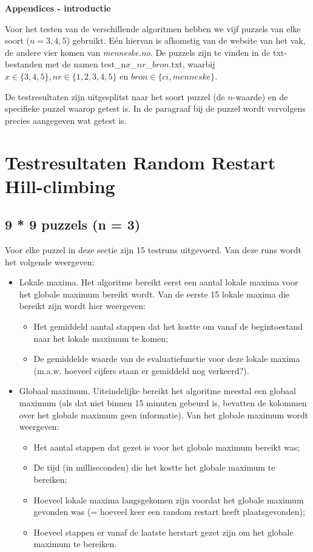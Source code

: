 \documentclass[]{report}
\begin{document}
\begin{appendices}
{\Huge \textbf{Appendices - introductie}}\newline

Voor het testen van de verschillende algoritmen hebben we vijf puzzels van elke soort ($n = 3, 4, 5$) gebruikt. Eén hiervan is afkomstig van de website van het vak, de andere vier komen van \textit{menneske.no}. De puzzels zijn te vinden in de txt-bestanden met de namen test\_n$x$\_$nr$\_$bron$.txt, waarbij $x \in \{3,4,5\}, nr \in \{1,2,3,4,5\}$ en $bron \in \{ci,menneske\}$.

De testresultaten zijn uitgesplitst naar het soort puzzel (de $n$-waarde) en de specifieke puzzel waarop getest is. In de paragraaf bij de puzzel wordt vervolgens precies aangegeven wat getest is.

\chapter{Testresultaten Random Restart Hill-climbing}
\section{9 * 9 puzzels (n = 3)}
Voor elke puzzel in deze sectie zijn 15 testruns uitgevoerd. Van deze runs wordt het volgende weergeven:
\begin{itemize}
\item Lokale maxima. Het algoritme bereikt eerst een aantal lokale maxima voor het globale maximum bereikt wordt. Van de eerste 15 lokale maxima die bereikt zijn wordt hier weergeven:
\begin{itemize}
\item Het gemiddeld aantal stappen dat het kostte om vanaf de begintoestand naar het lokale maximum te komen;
\item De gemiddelde waarde van de evaluatiefunctie voor deze lokale maxima (m.a.w. hoeveel cijfers staan er gemiddeld nog verkeerd?).
\end{itemize}
\item Globaal maximum. Uiteindelijke bereikt het algoritme meestal een globaal maximum (als dat niet binnen 15 minuten gebeurd is, bevatten de kolommen over het globale maximum geen informatie). Van het globale maximum wordt weergeven:
\begin{itemize}
\item Het aantal stappen dat gezet is voor het globale maximum bereikt was;
\item De tijd (in milliseconden) die het kostte het globale maximum te bereiken;
\item Hoeveel lokale maxima langsgekomen zijn voordat het globale maximum gevonden was (= hoeveel keer een random restart heeft plaatsgevonden);
\item Hoeveel stappen er vanaf de laatste herstart gezet zijn om het globale maximum te bereiken.
\end{itemize}
\end{itemize}

\end{appendices}
\end{document}
